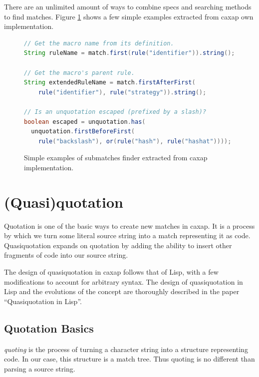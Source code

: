 There are an unlimited amount of ways to combine specs and searching methods to
find matches. Figure \ref{match_finder_examples} shows a few simple examples
extracted from caxap own implementation.

\begin{figure}[here]
\small
\begin{lstlisting}[language=Java, frame=single]
// Get the macro name from its definition.
String ruleName = match.first(rule("identifier")).string();

// Get the macro's parent rule.
String extendedRuleName = match.firstAfterFirst(
    rule("identifier"), rule("strategy")).string();

// Is an unquotation escaped (prefixed by a slash)?
boolean escaped = unquotation.has(
  unquotation.firstBeforeFirst(
    rule("backslash"), or(rule("hash"), rule("hashat"))));
\end{lstlisting}
\caption{Simple examples of submatches finder extracted from caxap
  implementation.}
\label{match_finder_examples}
\end{figure}

\section{(Quasi)quotation}
\label{quotation_manual}

Quotation is one of the basic ways to create new matches in caxap. It is a
process by which we turn some literal source string into a match representing it
as code. Quasiquotation expands on quotation by adding the ability to insert
other fragments of code into our source string.

The design of quasiquotation in caxap follows that of Lisp, with a few
modifications to account for arbitrary syntax. The design of quasiquotation in
Lisp and the evolutions of the concept are thoroughly described in the paper
``Quasiquotation in Lisp''. \cite{quasiquotation}

\subsection{Quotation Basics}
\label{quotation_basics}

\emph{quoting} is the process of turning a character string into a structure
representing code. In our case, this structure is a match tree. Thus quoting is
no different than parsing a source string.

